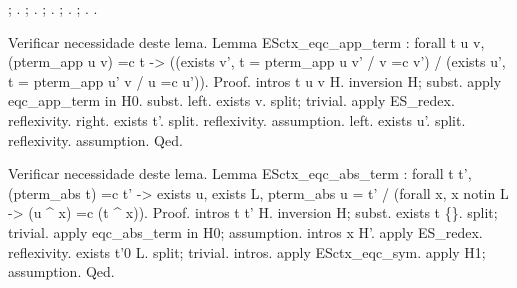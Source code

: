 \documentclass[12pt]{report}
\begin{document}
\begin{coqdoccode}
\coqdocindent{1.00em}
 ; .\coqdoceol
\coqdocindent{1.00em}
 ; .\coqdoceol
\coqdocindent{1.00em}
   ; .\coqdoceol
\coqdocindent{1.00em}
   ; .\coqdoceol
\coqdocindent{1.00em}
 ; .\coqdoceol
\coqdocnoindent
{}.\coqdoceol
\coqdocemptyline
\end{coqdoccode}
Verificar necessidade deste lema.
Lemma ESctx\_eqc\_app\_term :  forall t u v, (pterm\_app u v) =c t -> ((exists v', t = pterm\_app u v' / v =c v') / (exists u', t = pterm\_app u' v / u =c u')).
Proof. 
  intros t u v H. inversion H; subst.
  apply eqc\_app\_term in H0. subst.
  left. exists v.
  split; trivial.
  apply ES\_redex. reflexivity.
  right. exists t'. split. reflexivity. assumption.
  left. exists u'.
  split. reflexivity. assumption.
Qed. 

 Verificar necessidade deste lema.
Lemma ESctx\_eqc\_abs\_term :  forall t t', (pterm\_abs t) =c t' ->
                       exists u, exists L, pterm\_abs u = t' / (forall x, x notin L -> (u \^{} x) =c (t \^{} x)).
Proof. 
   intros t t' H. inversion H; subst. 
   exists t \{\}. split; trivial.
   apply eqc\_abs\_term in H0; assumption.
   intros x H'. apply ES\_redex. reflexivity.
   exists t'0 L. split; trivial. intros. 
   apply ESctx\_eqc\_sym. apply H1; assumption.
Qed. 
\end{document}
